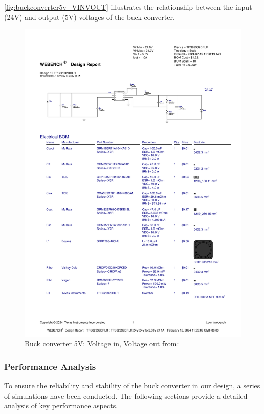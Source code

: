 \autoref{fig:buckconverter5v_VINVOUT} illustrates the relationship between the input (24V) and output (5V) voltages of the buck converter.
\begin{figure}[H]
    \centering
    \includegraphics[trim=0 235 0 70,clip,width=0.8\linewidth,page=3]{img//buckconverters//5v/WBDesign2.pdf}
    \caption{Buck converter 5V: Voltage in, Voltage out from: %
    }
    \label{fig:buckconverter5v_VINVOUT}
\end{figure}

\subsubsection{Performance Analysis}
To ensure the reliability and stability of the buck converter in our design, a series of simulations have been conducted. The following sections provide a detailed analysis of key performance aspects.

